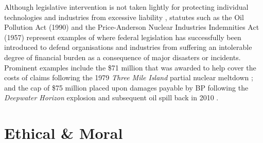 \documentclass[conference]{IEEEtran}
\begin{document}
	Although legislative intervention is not taken lightly for protecting individual technologies and industries from excessive liability \cite{marchant}, statutes such as the Oil Pollution Act (1990) \cite{oil-pollution-act} and the Price-Anderson Nuclear Industries Indemnities Act (1957) \cite{nuclear-act} represent examples of where federal legislation has successfully been introduced to defend organisations and industries from suffering an intolerable degree of financial burden as a consequence of major disasters or incidents. Prominent examples include the \$71 million that was awarded to help cover the costs of claims following the 1979 \textit{Three Mile Island} partial nuclear meltdown \cite{three-mile-island}; and the cap of \$75 million placed upon damages payable by BP following the \textit{Deepwater Horizon} explosion and subsequent oil spill back in 2010 \cite{deepwater}.






 \section{Ethical \& Moral}
 

%
%
\end{document}
